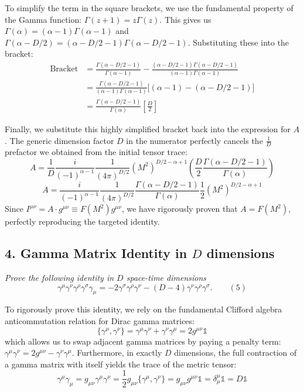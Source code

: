 To simplify the term in the square brackets, we use the fundamental property of the Gamma function: $\Gamma(z+1) = z\Gamma(z)$.
This gives us $\Gamma(\alpha) = (\alpha - 1)\Gamma(\alpha - 1)$ and $\Gamma(\alpha - D/2) = (\alpha - D/2 - 1)\Gamma(\alpha - D/2 - 1)$.
Substituting these into the bracket:
\[
    \begin{aligned}
        \text{Bracket} & = \frac{\Gamma(\alpha - D/2 - 1)}{\Gamma(\alpha - 1)} - \frac{(\alpha - D/2 - 1)\Gamma(\alpha - D/2 - 1)}{(\alpha - 1)\Gamma(\alpha - 1)} \\
                       & = \frac{\Gamma(\alpha - D/2 - 1)}{(\alpha - 1)\Gamma(\alpha - 1)} \Big[ (\alpha - 1) - (\alpha - D/2 - 1) \Big]                           \\
                       & = \frac{\Gamma(\alpha - D/2 - 1)}{\Gamma(\alpha)} \left[ \frac{D}{2} \right]
    \end{aligned}
\]

Finally, we substitute this highly simplified bracket back into the expression for $A$. The generic dimension factor $D$ in the numerator perfectly cancels the $\frac{1}{D}$ prefactor we obtained from the initial tensor trace:
\[
    A = \frac{1}{D} \frac{i}{(-1)^{\alpha-1}} \frac{1}{(4\pi)^{D/2}} (M^2)^{D/2 - \alpha + 1} \left( \frac{D}{2} \frac{\Gamma(\alpha - D/2 - 1)}{\Gamma(\alpha)} \right)
\]
\[
    A = \frac{i}{(-1)^{\alpha-1}} \frac{1}{(4\pi)^{D/2}} \frac{\Gamma(\alpha - D/2 - 1)}{\Gamma(\alpha)} \frac{1}{2} (M^2)^{D/2 - \alpha + 1}
\]
Since $I^{\mu\nu} = A \cdot g^{\mu\nu} \equiv F(M^2) g^{\mu\nu}$, we have rigorously proven that $A = F(M^2)$, perfectly reproducing the targeted identity.


\subsection*{4. Gamma Matrix Identity in $D$ dimensions}

\begin{center}
    \textit{Prove the following identity in $D$ space-time dimensions}
    \[
        \gamma^\mu \gamma^\nu \gamma^\rho \gamma^\sigma \gamma_\mu = -2 \gamma^\sigma \gamma^\rho \gamma^\nu - (D - 4) \gamma^\nu \gamma^\rho \gamma^\sigma. \qquad (5)
    \]
\end{center}

To rigorously prove this identity, we rely on the fundamental Clifford algebra anticommutation relation for Dirac gamma matrices:
\[
    \{ \gamma^\mu, \gamma^\nu \} = \gamma^\mu \gamma^\nu + \gamma^\nu \gamma^\mu = 2g^{\mu\nu}\mathbb{1}
\]
which allows us to swap adjacent gamma matrices by paying a penalty term: $\gamma^\mu \gamma^\nu = 2g^{\mu\nu} - \gamma^\nu \gamma^\mu$. Furthermore, in exactly $D$ dimensions, the full contraction of a gamma matrix with itself yields the trace of the metric tensor:
\[
    \gamma^\mu \gamma_\mu = g_{\mu\nu} \gamma^\mu \gamma^\nu = \frac{1}{2} g_{\mu\nu} \{ \gamma^\mu, \gamma^\nu \} = g_{\mu\nu} g^{\mu\nu} \mathbb{1} = \delta^\mu_\mu \mathbb{1} = D\mathbb{1}
\]

